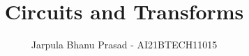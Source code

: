 \documentclass[journal,12pt,twocolumn]{IEEEtran}
\begin{document}
\let\StandardTheFigure\thefigure
\renewcommand{\thefigure}{\theproblem}



\def\putbox#1#2#3{\makebox[0in][l]{\makebox[#1][l]{}\raisebox{\baselineskip}[0in][0in]{\raisebox{#2}[0in][0in]{#3}}}}
     \def\rightbox#1{\makebox[0in][r]{#1}}
     \def\centbox#1{\makebox[0in]{#1}}
     \def\rightarrowpbox#1{\raisebox{-\baselineskip}[0in][0in]{#1}}
     \def\midbox#1{\raisebox{-0.5\baselineskip}[0in][0in]{#1}}

\vspace{3cm}

\title{ 
Circuits and Transforms
}


%
%
%

\author{Jarpula Bhanu Prasad - AI21BTECH11015} %
% 
%
\end{document}
